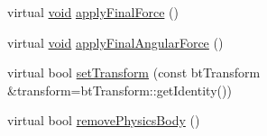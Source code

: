 \begin{DoxyCompactItemize}
\item 
virtual \mbox{\hyperlink{_thread_8h_af1e856da2e658414cb2456cb6f7ebc66}{void}} \mbox{\hyperlink{classnjli_1_1_physics_body_rigid_a46509fb78aac02dc21c6f801b1f61bf1}{apply\+Final\+Force}} ()
\item 
virtual \mbox{\hyperlink{_thread_8h_af1e856da2e658414cb2456cb6f7ebc66}{void}} \mbox{\hyperlink{classnjli_1_1_physics_body_rigid_aa8971d87ad91419622dd6438ee00f58c}{apply\+Final\+Angular\+Force}} ()
\item 
virtual bool \mbox{\hyperlink{classnjli_1_1_physics_body_rigid_a45c724055d7d0192f4e3c154b2c944f4}{set\+Transform}} (const bt\+Transform \&transform=bt\+Transform\+::get\+Identity())
\item 
virtual bool \mbox{\hyperlink{classnjli_1_1_physics_body_rigid_a7efbdfc46e8df26d073b00efaaf0c91c}{remove\+Physics\+Body}} ()
\end{DoxyCompactItemize}
